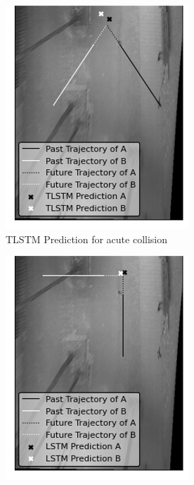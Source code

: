 \documentclass{article}
\begin{document}
\begin{figure}[H]
\begin{subfigure}{0.4\textwidth}
  \includegraphics[width=\linewidth]{quali_results/sim-acu-t.png}
  \caption{TLSTM Prediction for acute collision}
  \label{fig:sim-acu-t}
\end{subfigure}
\begin{subfigure}{0.40\textwidth}
  \centering
  \includegraphics[width=\linewidth]{quali_results/sim-perp-l.png}

\end{subfigure}
\end{figure}
\end{document}
